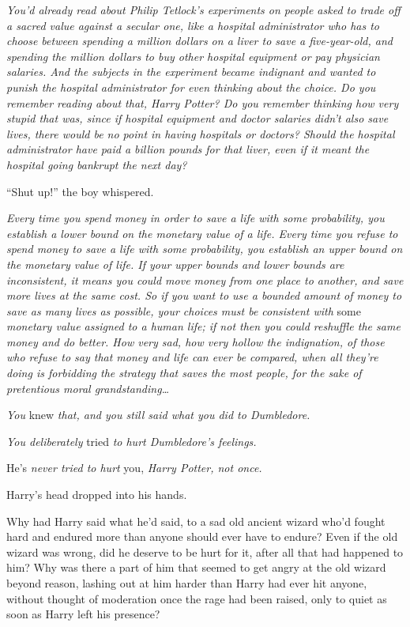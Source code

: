 \emph{You'd already read about Philip Tetlock's experiments on people
asked to trade off a sacred value against a secular one, like a hospital
administrator who has to choose between spending a million dollars on a
liver to save a five-year-old, and spending the million dollars to buy
other hospital equipment or pay physician salaries. And the subjects in
the experiment became indignant and wanted to punish the hospital
administrator for even thinking about the choice. Do you remember
reading about that, Harry Potter? Do you remember thinking how very
stupid that was, since if hospital equipment and doctor salaries didn't
also save lives, there would be no point in having hospitals or doctors?
Should the hospital administrator have paid a billion pounds for that
liver, even if it meant the hospital going bankrupt the next day?}

``Shut up!'' the boy whispered.

\emph{Every time you spend money in order to save a life with some
probability, you establish a lower bound on the monetary value of a
life. Every time you refuse to spend money to save a life with some
probability, you establish an upper bound on the monetary value of life.
If your upper bounds and lower bounds are inconsistent, it means you
could move money from one place to another, and save more lives at the
same cost. So if you want to use a bounded amount of money to save as
many lives as possible, your choices must be consistent with} some
\emph{monetary value assigned to a human life; if not then you could
reshuffle the same money and do better. How very sad, how very hollow
the indignation, of those who refuse to say that money and life can ever
be compared, when all they're doing is forbidding the strategy that
saves the most people, for the sake of pretentious moral
grandstanding\ldots{}}

\emph{You} knew \emph{that, and you still said what you did to
Dumbledore.}

\emph{You deliberately} tried \emph{to hurt Dumbledore's feelings.}

He's \emph{never tried to hurt} you, \emph{Harry Potter, not once.}

Harry's head dropped into his hands.

Why had Harry said what he'd said, to a sad old ancient wizard who'd
fought hard and endured more than anyone should ever have to endure?
Even if the old wizard was wrong, did he deserve to be hurt for it,
after all that had happened to him? Why was there a part of him that
seemed to get angry at the old wizard beyond reason, lashing out at him
harder than Harry had ever hit anyone, without thought of moderation
once the rage had been raised, only to quiet as soon as Harry left his
presence?

